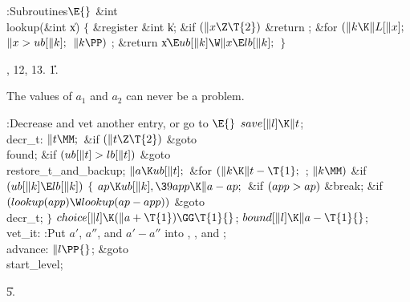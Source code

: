 \Y\B\4:Subroutines\X${}\E{}$\6
\&{int} \\{lookup}(\&{int} \|x)\6
${}\{{}$\1\6
\&{register} \&{int} \|k;\7
\&{if} ${}(\|x\Z\T{2}){}$\1\5
\&{return} ;\2\6
\&{for} ${}(\|k\K\|L[\|x];{}$ ${}\|x>\\{ub}[\|k];{}$ ${}\|k\PP){}$\1\5
;\2\6
\&{return} \|x${}\E\\{ub}[\|k]\W\|x\E\\{lb}[\|k];{}$\6
\4${}\}{}$\2\par
{}, 12, 13.
\U1.\fi

The values of $a_1$ and $a_2$ can never be a problem.

\Y\B\4:Decrease  and vet another entry, or go to \X${}%
\E{}$\6
$\\{save}[\|l]\K\|t{}$;%
\6
\4\\{decr\_t}:\5
${}\|t\MM;{}$\6
\&{if} ${}(\|t\Z\T{2}){}$\1\5
\&{goto} \\{found};\2\6
\&{if} ${}(\\{ub}[\|t]>\\{lb}[\|t]){}$\1\5
\&{goto} \\{restore\_t\_and\_backup};\2\6
${}\|a\K\\{ub}[\|t];{}$\6
\&{for} ${}(\|k\K\|t-\T{1};{}$  ; ${}\|k\MM){}$\1\6
\&{if} ${}(\\{ub}[\|k]\E\\{lb}[\|k]){}$\5
${}\{{}$\1\6
${}\\{ap}\K\\{ub}[\|k],\39\\{app}\K\|a-\\{ap};{}$\6
\&{if} ${}(\\{app}>\\{ap}){}$\1\5
\&{break};\2\6
\&{if} ${}(\\{lookup}(\\{app})\W\\{lookup}(\\{ap}-\\{app})){}$\1\5
\&{goto} \\{decr\_t};\2\6
\4${}\}{}$\2\2\6
${}\\{choice}[\|l]\K(\|a+\T{1})\GG\T{1}{}$;\6
${}\\{bound}[\|l]\K\|a-\T{1}{}$;\6
\4\\{vet\_it}:\5
:Put $a'$, $a''$, and $a'-a''$ into , , and \X;\6
\4\\{advance}:\5
${}\|l\PP{}$;\5
\&{goto} \\{start\_level};\par
\U5.\fi

